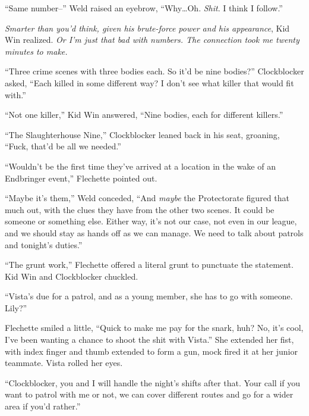 ``Same number--'' Weld raised an eyebrow, ``Why\ldots Oh.  \emph{Shit}.  I think I follow.''



\emph{Smarter than you'd think, given his brute-force power and his appearance}, Kid Win realized.  \emph{Or I'm just that bad with numbers.  The connection took me twenty minutes to make.}



``Three crime scenes with three bodies each.  So it'd be nine bodies?'' Clockblocker asked, ``Each killed in some different way?  I don't see what killer that would fit with.''



``Not one killer,'' Kid Win answered, ``Nine bodies, each for different killers.''



``The Slaughterhouse Nine,'' Clockblocker leaned back in his seat, groaning, ``Fuck, that'd be all we needed.''



``Wouldn't be the first time they've arrived at a location in the wake of an Endbringer event,'' Flechette pointed out.



``Maybe it's them,'' Weld conceded, ``And \emph{maybe} the Protectorate figured that much out, with the clues they have from the other two scenes.  It could be someone or something else.  Either way, it's not our case, not even in our league, and we should stay as hands off as we can manage.  We need to talk about patrols and tonight's duties.''



``The grunt work,'' Flechette offered a literal grunt to punctuate the statement.  Kid Win and Clockblocker chuckled.



``Vista's due for a patrol, and as a young member, she has to go with someone.  Lily?''



Flechette smiled a little, ``Quick to make me pay for the snark, huh?  No, it's cool, I've been wanting a chance to shoot the shit with Vista.''  She extended her fist, with index finger and thumb extended to form a gun, mock fired it at her junior teammate.  Vista rolled her eyes.



``Clockblocker, you and I will handle the night's shifts after that.  Your call if you want to patrol with me or not, we can cover different routes and go for a wider area if you'd rather.''




